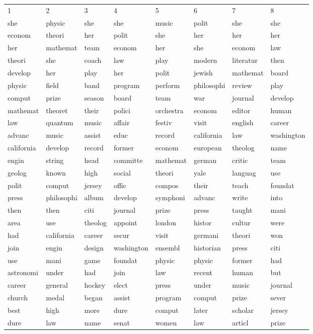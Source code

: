 \documentclass[11pt]{article}
\begin{document}
\begin{org}
\begin{center}
\begin{tabular}{llllllll}
1 & 2 & 3 & 4 & 5 & 6 & 7 & 8\\
she & physic & she & she & music & polit & she & she\\
econom & theori & her & polit & she & her & her & her\\
her & mathemat & team & econom & her & she & econom & law\\
theori & she & coach & law & play & modern & literatur & then\\
develop & her & play & her & polit & jewish & mathemat & board\\
physic & field & band & program & perform & philosophi & review & play\\
comput & prize & season & board & team & war & journal & develop\\
mathemat & theoret & their & polici & orchestra & econom & editor & human\\
law & quantum & music & affair & festiv & visit & english & career\\
advanc & music & assist & educ & record & california & law & washington\\
california & develop & record & former & econom & european & theolog & name\\
engin & string & head & committe & mathemat & german & critic & team\\
geolog & known & high & social & theori & yale & languag & use\\
polit & comput & jersey & offic & compos & their & teach & foundat\\
press & philosophi & album & develop & symphoni & advanc & write & into\\
then & then & citi & journal & prize & press & taught & mani\\
area & use & theolog & appoint & london & histor & cultur & were\\
had & california & career & secur & visit & germani & theori & won\\
join & engin & design & washington & ensembl & historian & press & citi\\
use & mani & game & foundat & physic & physic & former & had\\
astronomi & under & had & join & law & recent & human & but\\
career & general & hockey & elect & press & under & music & journal\\
church & medal & began & assist & program & comput & prize & sever\\
best & high & more & dure & comput & later & scholar & jersey\\
dure & law & name & senat & women & law & articl & prize\\
\end{tabular}
\end{center}
\end{org}
\end{document}
